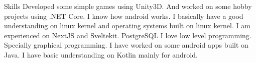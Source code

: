 
\begin{rubric}{Skills}
\entry*[C\#]
	Developed some simple games using Unity3D. And worked on some hobby projects using .NET Core.
\entry*[Android]
	I know how android works. I basically have a good understanding on linux kernel and operating systems built on linux kernel.
\entry*[Web]
	I am experienced on NextJS and Sveltekit.
\entry*[Databases]
	PostgreSQL
\entry*[C++]
	I love low level programming. Specially graphical programming.
	\entry*[Java]
	I have worked on some android apps built on Java.
\entry*[Kotlin]
	I have basic understanding on Kotlin mainly for android.
\end{rubric}